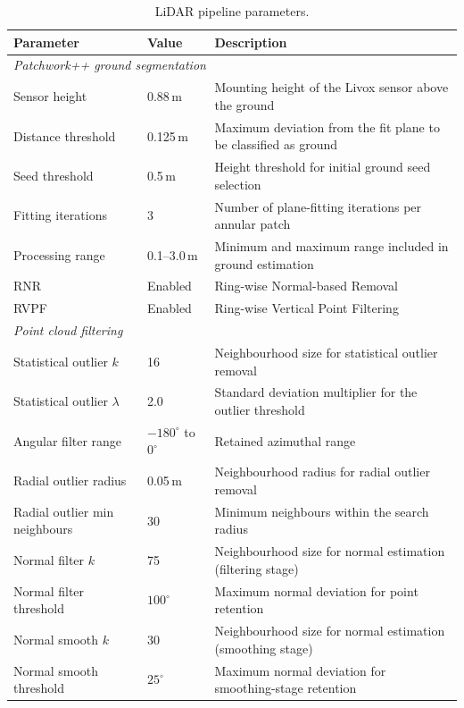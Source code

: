\begin{table}[htbp]
  \centering
  \caption{LiDAR pipeline parameters.}
  \label{tab:pa-lidar-params}
  \begin{tabularx}{\textwidth}{l l X}
    \toprule
    \textbf{Parameter} & \textbf{Value} & \textbf{Description} \\
    \midrule
    \multicolumn{3}{l}{\textit{Patchwork++ ground segmentation}} \\
    \midrule
    Sensor height          & 0.88\,m        & Mounting height of the Livox sensor above the ground \\
    Distance threshold     & 0.125\,m       & Maximum deviation from the fit plane to be classified as ground \\
    Seed threshold         & 0.5\,m         & Height threshold for initial ground seed selection \\
    Fitting iterations     & 3              & Number of plane-fitting iterations per annular patch \\
    Processing range       & 0.1--3.0\,m    & Minimum and maximum range included in ground estimation \\
    RNR                    & Enabled        & Ring-wise Normal-based Removal \\
    RVPF                   & Enabled        & Ring-wise Vertical Point Filtering \\
    \midrule
    \multicolumn{3}{l}{\textit{Point cloud filtering}} \\
    \midrule
    Statistical outlier $k$             & 16                        & Neighbourhood size for statistical outlier removal \\
    Statistical outlier $\lambda$       & 2.0                       & Standard deviation multiplier for the outlier threshold \\
    Angular filter range                & $-180^{\circ}$ to $0^{\circ}$ & Retained azimuthal range \\
    Radial outlier radius               & 0.05\,m                   & Neighbourhood radius for radial outlier removal \\
    Radial outlier min neighbours       & 30                        & Minimum neighbours within the search radius \\
    Normal filter $k$                   & 75                        & Neighbourhood size for normal estimation (filtering stage) \\
    Normal filter threshold             & $100^{\circ}$             & Maximum normal deviation for point retention \\
    Normal smooth $k$                   & 30                        & Neighbourhood size for normal estimation (smoothing stage) \\
    Normal smooth threshold             & $25^{\circ}$              & Maximum normal deviation for smoothing-stage retention \\
    \bottomrule
  \end{tabularx}
\end{table}

